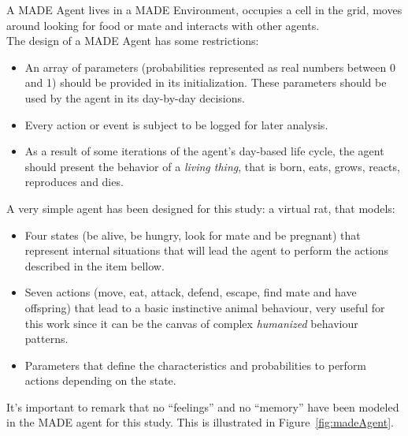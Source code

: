 \documentclass{sig-alternate}
\begin{document}


A MADE Agent lives in a MADE Environment, occupies a cell in the grid, moves around looking for food or mate and interacts with other agents.\\

The design of a MADE Agent has some restrictions:
\begin{itemize}
\item An array of parameters (probabilities represented as real numbers between 0 and 1) should be provided in its initialization. These parameters should be used by the agent in its day-by-day decisions.
\item Every action or event is subject to be logged for later analysis.
\item As a result of some iterations of the agent's day-based life cycle, the agent should present the behavior of a \textit{living thing}, that is born, eats, grows, reacts, reproduces and dies.  
\end{itemize}

A very simple agent has been designed for this study: a virtual
rat, that models:
\begin{itemize}
\item Four states (be alive, be hungry, look for
mate and be pregnant) that represent internal situations that will lead the
agent to perform the actions described in the item bellow. %
\item Seven actions (move, eat, attack, defend, escape,
find mate and have offspring) that lead to a basic instinctive animal
behaviour, very useful for this work since it can be the canvas of 
complex \textit{humanized} behaviour patterns.
\item Parameters that define the characteristics and probabilities to
perform actions depending on the state.
\end{itemize}
It's important to remark that no ``feelings'' and no ``memory''
have been modeled in the MADE agent for this study. This is
illustrated in Figure~\ref{fig:madeAgent}.
\end{document}
